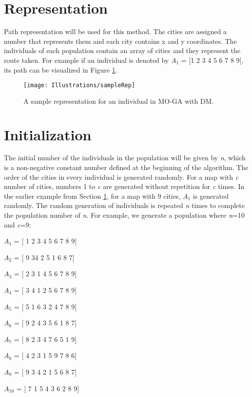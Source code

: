 \section{Representation} \label{sampleRep}
\indent \indent Path representation will be used for this method. The cities are assigned a number that represents them and each city contains x and y coordinates. The individuals of each population contain an array of cities and they represent the route taken. For example if an individual is denoted by $A_1$ = [1 2 3 4 5 6 7 8 9], its path can be visualized in Figure \ref{fig:sampleRepresentation}.

\begin{figure}[H]
	\caption{A sample representation for an individual in MO-GA with DM.}
	\texttt{[image: Illustrations/sampleRep]}
	\centering
	\label{fig:sampleRepresentation}
\end{figure}

\section{Initialization} \label{sampleInit}
\indent \indent The initial number of the individuals in the population will be given by \emph{n}, which is a non-negative constant number defined at the beginning of the algorithm. The order of the cities in every individual is generated randomly. For a map with \emph{c} number of cities, numbers 1 to \emph{c} are generated without repetition for \emph{c} times. In the earlier example from Section \ref{sampleRep}, for a map with 9 cities, \emph{$A_1$} is generated randomly. The random generation of individuals is repeated \emph{n} times to complete the population number of \emph{n}. For example, we generate a population where \emph{n}=10 and \emph{c}=9: \par 

$A_{1}$ = [ 1 2 3 4 5 6 7 8 9] \par 
$A_{2}$ = [ 9 34 2 5 1 6 8 7] \par 
$A_{3}$ = [ 2 3 1 4 5 6 7 8 9] \par 
$A_{4}$ = [ 3 4 1 2 5 6 7 8 9] \par 
$A_{5}$ = [ 5 1 6 3 2 4 7 8 9] \par 
$A_{6}$ = [ 9 2 4 3 5 6 1 8 7] \par 
$A_{7}$ = [ 8 2 3 4 7 6 5 1 9] \par 
$A_{8}$ = [ 4 2 3 1 5 9 7 8 6] \par 
$A_{9}$ = [ 9 3 4 2 1 5 6 8 7] \par
$A_{10}$ = [ 7 1 5 4 3 6 2 8 9] \par 

